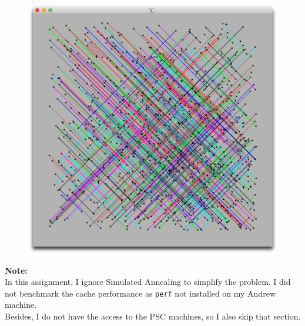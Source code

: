 \documentclass[letterpaper,11pt]{exam}
\begin{document}
\begin{figure}[h]
\begin{minipage}{0.3\textwidth}
        \label{fig:question1b}
    \end{minipage}
    \hspace{0.2cm}
    \begin{minipage}{0.3\textwidth}
        \centering
        \includegraphics[width=\textwidth]{img/circuit_1024x1024_512.jpg}
        \label{fig:question1b}
    \end{minipage}
\end{figure}

\vspace{0.5cm}
\textbf{Note:} \\
In this assignment, I ignore Simulated Annealing to simplify the problem. I did not benchmark the cache performance as \texttt{perf} not installed on my Andrew machine. \\
Besides, I do not have the access to the PSC machines, so I also skip that section.
\end{document}

